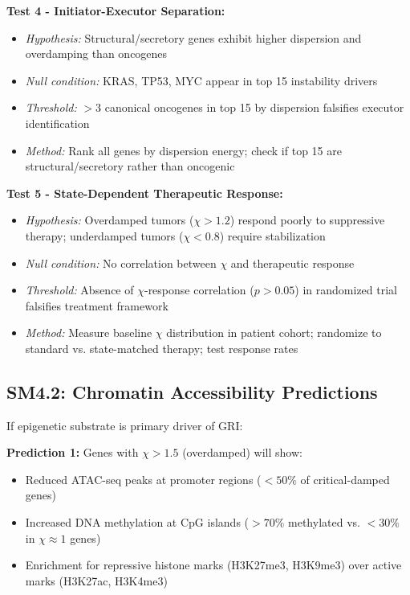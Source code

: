\documentclass[11pt,letterpaper]{article}
\begin{document}
\textbf{Test 4 - Initiator-Executor Separation:}
\begin{itemize}
\item \textit{Hypothesis:} Structural/secretory genes exhibit higher dispersion and overdamping than oncogenes
\item \textit{Null condition:} KRAS, TP53, MYC appear in top 15 instability drivers
\item \textit{Threshold:} $>3$ canonical oncogenes in top 15 by dispersion falsifies executor identification
\item \textit{Method:} Rank all genes by dispersion energy; check if top 15 are structural/secretory rather than oncogenic
\end{itemize}

\textbf{Test 5 - State-Dependent Therapeutic Response:}
\begin{itemize}
\item \textit{Hypothesis:} Overdamped tumors ($\chi > 1.2$) respond poorly to suppressive therapy; underdamped tumors ($\chi < 0.8$) require stabilization
\item \textit{Null condition:} No correlation between $\chi$ and therapeutic response
\item \textit{Threshold:} Absence of $\chi$-response correlation ($p > 0.05$) in randomized trial falsifies treatment framework
\item \textit{Method:} Measure baseline $\chi$ distribution in patient cohort; randomize to standard vs. state-matched therapy; test response rates
\end{itemize}

\subsection{SM4.2: Chromatin Accessibility Predictions}

If epigenetic substrate is primary driver of GRI:

\textbf{Prediction 1:} Genes with $\chi > 1.5$ (overdamped) will show:
\begin{itemize}
\item Reduced ATAC-seq peaks at promoter regions ($<50\%$ of critical-damped genes)
\item Increased DNA methylation at CpG islands ($>70\%$ methylated vs. $<30\%$ in $\chi \approx 1$ genes)
\item Enrichment for repressive histone marks (H3K27me3, H3K9me3) over active marks (H3K27ac, H3K4me3)
\end{itemize}
\end{document}
